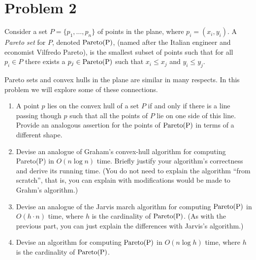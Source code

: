 \documentclass[11pt]{article}
\newcommand{\pareto}[1]{\rm{Pareto}(#1)}
\begin{document}
\newpage
\section*{Problem 2}

Consider a set $P = \{p_1, \ldots, p_n \}$ of points in the plane, where $p_i =
(x_i, y_i)$. A \emph{Pareto set} for $P$, denoted $\pareto{P}$, (named after
the Italian engineer and economist Vilfredo Pareto), is the smallest subset of points
such that for all $p_i \in P$ there exists a $p_j \in \pareto{P}$ such that $x_i \leq x_j$ and
$y_i \leq y_j$.


Pareto sets and convex hulls in the plane are similar in many respects.  In
this problem we will explore some of these connections.

\begin{enumerate}

\item A point $p$ lies on the convex hull of a set $P$ if and only if there is
a line passing though $p$ such that all the points of $P$ lie on one side of
this line.  Provide an analogous assertion for the points of $\pareto{P}$ in
terms of a different shape.

\item Devise an analogue of Graham's convex-hull algorithm for computing
\pareto{P} in $O(n \log n)$ time.  Briefly justify your algorithm's correctness
and derive its running time.  (You do not need to explain the algorithm ``from
scratch'', that is, you can explain with modifications would be made to Grahm's
algorithm.)

\item Devise an analogue of the Jarvis march algorithm for computing
$\pareto{P}$ in $O(h \cdot n)$ time, where $h$ is the cardinality of
$\pareto{P}$.  (As with the previous part, you can just explain the differences
with Jarvis's algorithm.)

\item Devise an algorithm for computing $\pareto{P}$ in $O(n
\log h)$ time, where $h$ is the cardinality of $\pareto{P}$.

\end{enumerate}
\end{document}
